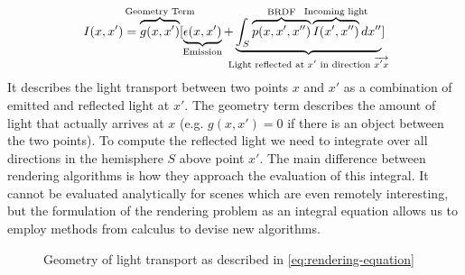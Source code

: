 \documentclass{ACGSeminar}
\begin{document}
\begin{equation} \label{eq:rendering-equation}
I(x,x')= \overbrace{g(x,x')}^{\mathclap{\text{Geometry Term}}}
         [
         \underbrace{\epsilon(x,x')}_{\mathclap{\text{Emission}}}
         + \underbrace{
         \int_{S}{\overbrace{p(x,x',x'')}^{\mathclap{\text{BRDF}}}
                  \overbrace{I(x',x'') }^{\mathclap{\text{Incoming light}}} dx''}
         }_{\mathclap{\text{Light reflected at $x'$ in direction $\overrightarrow{x'x}$}}} ]
\end{equation}
It describes the light transport between two points $x$ and $x'$ as a combination of emitted and reflected light at $x'$. The geometry term describes the amount of light that actually arrives at $x$ (e.g. $g(x,x') = 0$ if there is an object between the two points). To compute the reflected light we need to integrate over all directions in the hemisphere $S$ above point $x'$. 
The main difference between rendering algorithms is how they approach the evaluation of this integral. It cannot be evaluated analytically for scenes which are even remotely interesting, but the formulation of the rendering problem as an integral equation allows us to employ methods from calculus to devise new algorithms.

\begin{figure}[htb!]
  \begin{centering}
    \par
  \end{centering}
  \caption{Geometry of light transport as described in \eqref{eq:rendering-equation}}
  \label{fig:light-transport}
\end{figure}
\end{document}

